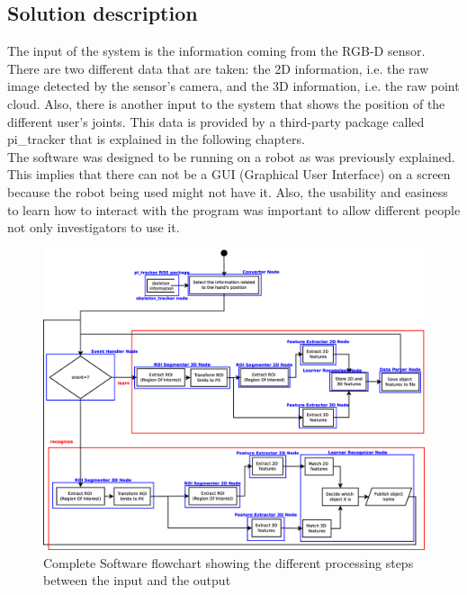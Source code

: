 \subsection{Solution description}

The input of the system is the information coming from the RGB-D sensor. There are two different data that are taken: the 2D information, i.e. the raw image detected by the sensor's camera, and the 3D information, i.e. the raw point cloud. Also, there is another input to the system that shows the position of the different user's joints. This data is provided by a third-party package called pi\_tracker that is explained in the following chapters. 
\\

The software was designed to be running on a robot as was previously explained. This implies that there can not be a GUI (Graphical User Interface) on a screen because the robot being used might not have it. Also, the usability and easiness to learn how to interact with the program was important to allow different people not only investigators to use it. 
\\


\begin{figure}[H]
	\begin{center}
\includegraphics[scale=0.3]{img/diagrams/flowcharts.eps}
	\caption[Software flowchart]{Complete Software flowchart showing the different processing steps between the input and the output}
	\end{center}
\end{figure}


